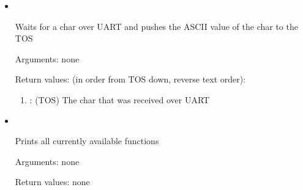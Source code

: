 \begin{itemize}
\noindent Return values: none

\item {}\ 

\noindent Waits for a char over UART and pushes the ASCII value of the char to the TOS

\noindent Arguments: none

\noindent Return values: (in order from TOS down, reverse text order):
\begin{enumerate}
\item {}: (TOS) The char that was received over UART
\end{enumerate}

\item {}\ \forthinline{( -- )}

\noindent Prints all currently available functions

\noindent Arguments: none

\noindent Return values: none

\end{itemize}

